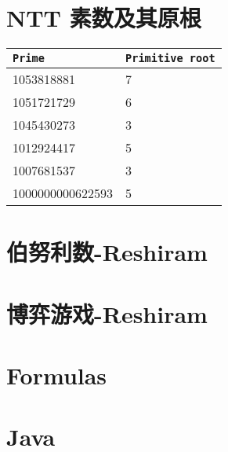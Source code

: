 \section{NTT 素数及其原根}
\begin{tabular}{|l|l|}
	\hline
	\texttt{Prime} & \texttt{Primitive root} \\
	\hline
	1053818881 & 7 \\
	\hline
	1051721729 & 6 \\
	\hline
	1045430273 & 3 \\
	\hline
	1012924417 & 5 \\
	\hline
	1007681537 & 3 \\
	\hline
	1000000000622593 & 5 \\
	\hline
\end{tabular}

\section{伯努利数-Reshiram}


\section{博弈游戏-Reshiram}


\section{Formulas}



\section{Java}
\inputminted{java}{./hint/template.java}


